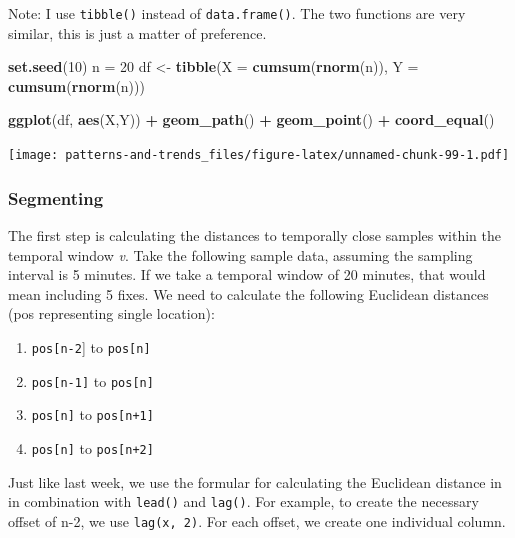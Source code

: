 \documentclass[]{book}
\newenvironment{Shaded}{\begin{snugshade}}{\end{snugshade}}
\newcommand{\DataTypeTok}[1]{\textcolor[rgb]{0.13,0.29,0.53}{#1}}
\newcommand{\DecValTok}[1]{\textcolor[rgb]{0.00,0.00,0.81}{#1}}
\newcommand{\KeywordTok}[1]{\textcolor[rgb]{0.13,0.29,0.53}{\textbf{#1}}}
\newcommand{\NormalTok}[1]{#1}
\newcommand{\OperatorTok}[1]{\textcolor[rgb]{0.81,0.36,0.00}{\textbf{#1}}}
\newcommand{\StringTok}[1]{\textcolor[rgb]{0.31,0.60,0.02}{#1}}
\providecommand{\tightlist}{%
  \setlength{\itemsep}{0pt}\setlength{\parskip}{0pt}}
\begin{document}
Note: I use \texttt{tibble()} instead of \texttt{data.frame()}. The two functions are very similar, this is just a matter of preference.

\begin{Shaded}
\begin{Highlighting}[]
\KeywordTok{set.seed}\NormalTok{(}\DecValTok{10}\NormalTok{)}
\NormalTok{n =}\StringTok{ }\DecValTok{20}
\NormalTok{df <-}\StringTok{ }\KeywordTok{tibble}\NormalTok{(}\DataTypeTok{X =} \KeywordTok{cumsum}\NormalTok{(}\KeywordTok{rnorm}\NormalTok{(n)), }\DataTypeTok{Y =} \KeywordTok{cumsum}\NormalTok{(}\KeywordTok{rnorm}\NormalTok{(n)))}

\KeywordTok{ggplot}\NormalTok{(df, }\KeywordTok{aes}\NormalTok{(X,Y)) }\OperatorTok{+}
\StringTok{  }\KeywordTok{geom_path}\NormalTok{() }\OperatorTok{+}\StringTok{ }
\StringTok{  }\KeywordTok{geom_point}\NormalTok{() }\OperatorTok{+}
\StringTok{  }\KeywordTok{coord_equal}\NormalTok{()}
\end{Highlighting}
\end{Shaded}

\texttt{[image: patterns-and-trends\_files/figure-latex/unnamed-chunk-99-1.pdf]}

\hypertarget{segmenting}{%
\subsubsection{Segmenting}\label{segmenting}}

The first step is calculating the distances to temporally close samples within the temporal window \emph{v}. Take the following sample data, assuming the sampling interval is 5 minutes. If we take a temporal window of 20 minutes, that would mean including 5 fixes. We need to calculate the following Euclidean distances (pos representing single location):

\begin{enumerate}
\def\labelenumi{\arabic{enumi}.}
\tightlist
\item
  \texttt{pos{[}n-2}{]} to \texttt{pos{[}n{]}}
\item
  \texttt{pos{[}n-1{]}} to \texttt{pos{[}n{]}}
\item
  \texttt{pos{[}n{]}} to \texttt{pos{[}n+1{]}}
\item
  \texttt{pos{[}n{]}} to \texttt{pos{[}n+2{]}}
\end{enumerate}

Just like last week, we use the formular for calculating the Euclidean distance in in combination with \texttt{lead()} and \texttt{lag()}. For example, to create the necessary offset of n-2, we use \texttt{lag(x,\ 2)}. For each offset, we create one individual column.
\end{document}
